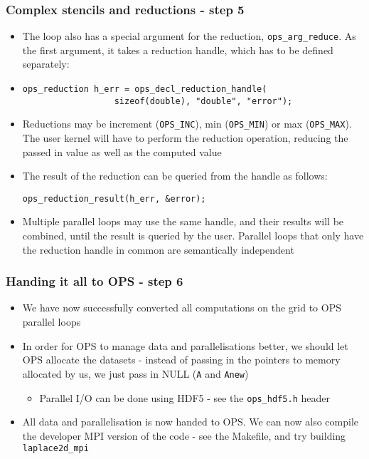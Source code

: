 \documentclass{beamer}
\begin{document}
\begin{frame}[fragile]
\frametitle{Complex stencils and reductions - step 5}
\begin{itemize}
\item The loop also has a special argument for the reduction, \texttt{ops\_arg\_reduce}. As the first argument, it takes a reduction handle, which has to be defined separately:
\item \begin{lstlisting}
ops_reduction h_err = ops_decl_reduction_handle(
                  sizeof(double), "double", "error");\end{lstlisting}  
  \item Reductions may be increment (\texttt{OPS\_INC}), min (\texttt{OPS\_MIN}) or max (\texttt{OPS\_MAX}). The user kernel will have to perform the reduction operation, reducing the passed in value as well as the computed value
  \item The result of the reduction can be queried from the handle as follows:
\begin{lstlisting}
ops_reduction_result(h_err, &error);
\end{lstlisting}  
\item Multiple parallel loops may use the same handle, and their results will be combined, until the result is queried by the user. Parallel loops that only have the reduction handle in common are semantically independent
\end{itemize}
\end{frame}

\begin{frame}[fragile]
\frametitle{Handing it all to OPS - step 6}
\begin{itemize}
\item We have now successfully converted all computations on the grid to OPS parallel loops
\item In order for OPS to manage data and parallelisations better, we should let OPS allocate the datasets - instead of passing in the pointers to memory allocated by us, we just pass in NULL (\texttt{A} and \texttt{Anew})
\begin{itemize}
\item Parallel I/O can be done using HDF5 - see the \texttt{ops\_hdf5.h} header
\end{itemize}
\item All data and parallelisation is now handed to OPS. We can now also compile the developer MPI version of the code - see the Makefile, and try building \texttt{laplace2d\_mpi}
\end{itemize}
\end{frame}
\end{document}
